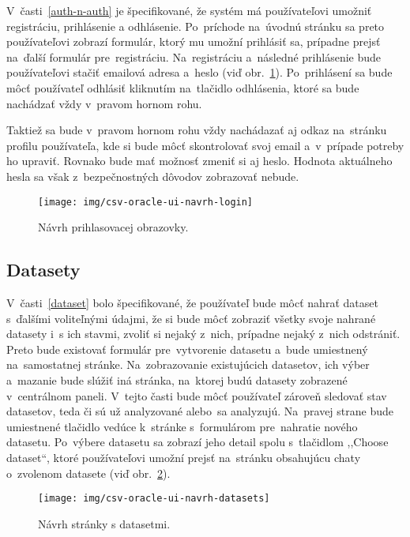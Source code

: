 V~časti~\ref{auth-n-auth} je špecifikované, že systém má používateľovi umožniť registráciu, prihlásenie a odhlásenie. Po~príchode na~úvodnú stránku sa preto používateľovi zobrazí formulár, ktorý mu umožní prihlásiť sa, prípadne prejsť na~ďalší formulár pre~registráciu. Na~registráciu a~následné prihlásenie bude používateľovi stačiť emailová adresa a~heslo (viď obr.~\ref{csv-oracle-ui-navrh-login}). Po~prihlásení sa bude môcť používateľ odhlásiť kliknutím na~tlačidlo odhlásenia, ktoré sa bude nachádzať vždy v~pravom hornom rohu.

Taktiež sa bude v~pravom hornom rohu vždy nachádazať aj odkaz na~stránku profilu používateľa, kde si bude môcť skontrolovať svoj email a~v~prípade potreby ho upraviť. Rovnako bude mať možnosť zmeniť si aj heslo. Hodnota aktuálneho hesla sa však z~bezpečnostných dôvodov zobrazovať nebude.

\begin{figure}[H]\centering
\texttt{[image: img/csv-oracle-ui-navrh-login]}
\caption{Návrh prihlasovacej obrazovky.}
\label{csv-oracle-ui-navrh-login}
\end{figure}

\subsection{Datasety}
\label{datasety-navrh}

V~časti~\ref{dataset} bolo špecifikované, že používateľ bude môcť nahrať dataset s~ďalšími voliteľnými údajmi, že si bude môcť zobraziť všetky svoje nahrané datasety i~s ich stavmi, zvoliť si nejaký z~nich, prípadne nejaký z~nich odstrániť. Preto bude existovať formulár pre~vytvorenie datasetu a~bude umiestnený na~samostatnej stránke. Na~zobrazovanie existujúcich datasetov, ich výber a~mazanie bude slúžiť iná stránka, na~ktorej budú datasety zobrazené v~centrálnom paneli. V~tejto časti bude môcť používateľ zároveň sledovať stav datasetov, teda či sú už analyzované alebo~sa analyzujú. Na~pravej strane bude umiestnené tlačidlo vedúce k~stránke s~formulárom pre~nahratie nového datasetu. Po~výbere datasetu sa zobrazí jeho detail spolu s~tlačidlom ,,Choose dataset``, ktoré používateľovi umožní prejsť na~stránku obsahujúcu chaty o~zvolenom datasete (viď obr.~\ref{csv-oracle-ui-navrh-datasets}).

\begin{figure}[H]\centering
\texttt{[image: img/csv-oracle-ui-navrh-datasets]}
\caption{Návrh stránky s datasetmi.}
\label{csv-oracle-ui-navrh-datasets}
\end{figure}

